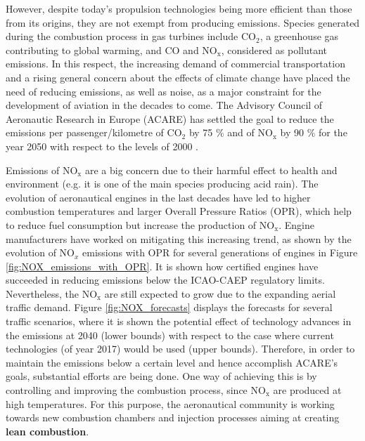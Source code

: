 However, despite today's propulsion technologies being more efficient than those from its origins, they are not exempt from producing emissions. Species generated during the combustion process in gas turbines include CO$_2$, a greenhouse gas contributing to global warming, and CO and NO$_\mathrm{x}$, considered as pollutant emissions. In this respect, the increasing demand of commercial transportation and a rising general concern about the effects of climate change have placed the need of reducing emissions, as well as noise, as a major constraint for the development of aviation in the decades to come. The Advisory Council of Aeronautic Research in Europe (ACARE) has settled the goal to reduce the emissions per passenger/kilometre of CO$_2$ by 75 $\%$ and of NO$_\mathrm{x}$ by 90 $\%$ for the year 2050 with respect to the levels of 2000 .

Emissions of NO$_\mathrm{x}$ are a big concern due to their harmful effect to health and environment (e.g. it is one of the main species producing acid rain). The evolution of aeronautical engines in the last decades have led to higher combustion temperatures and larger Overall Pressure Ratios (OPR), which help to reduce fuel consumption but increase the production of NO$_\mathrm{x}$. Engine manufacturers have worked on mitigating this increasing trend, as shown by the evolution of NO$_x$ emissions with OPR for several generations of engines in Figure \ref{fig:NOX_emissions_with_OPR}. It is shown how certified engines have succeeded in reducing emissions below the ICAO-CAEP regulatory limits. Nevertheless, the NO$_\mathrm{x}$ are still expected to grow due to the expanding aerial traffic demand. Figure \ref{fig:NOX_forecasts} displays the forecasts for several traffic scenarios, where it is shown the potential effect of technology advances in the emissions at 2040 (lower bounds) with respect to the case where current technologies (of year 2017) would be used (upper bounds). Therefore, in order to maintain the emissions below a certain level and hence accomplish ACARE's goals, substantial efforts are being done. One way of achieving this is by controlling and improving the combustion process, since NO$_\mathrm{x}$ are produced at high temperatures. For this purpose, the aeronautical community is working towards new combustion chambers and injection processes aiming at creating \textbf{lean combustion}.

